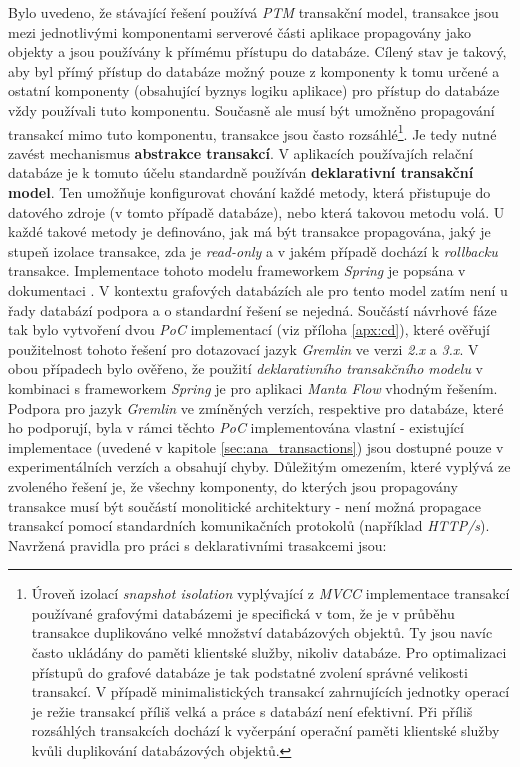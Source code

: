 Bylo uvedeno, že stávající řešení používá \textit{PTM} transakční model, transakce jsou mezi jednotlivými komponentami serverové části aplikace propagovány jako objekty a jsou používány k přímému přístupu do databáze. Cílený stav je takový, aby byl přímý přístup do databáze možný pouze z komponenty k tomu určené a ostatní komponenty (obsahující byznys logiku aplikace) pro přístup do databáze vždy používali tuto komponentu. Současně ale musí být umožněno propagování transakcí mimo tuto komponentu, transakce jsou často rozsáhlé\footnote{Úroveň izolací \textit{snapshot isolation} vyplývající z \textit{MVCC} implementace transakcí používané grafovými databázemi je specifická v tom, že je v průběhu transakce duplikováno velké množství databázových objektů. Ty jsou navíc často ukládány do paměti klientské služby, nikoliv databáze. Pro optimalizaci přístupů do grafové databáze je tak podstatné zvolení správné velikosti transakcí. V případě minimalistických transakcí zahrnujících jednotky operací je režie transakcí příliš velká a práce s databází není efektivní. Při příliš rozsáhlých transakcích dochází k vyčerpání operační paměti klientské služby kvůli duplikování databázových objektů.}. Je tedy nutné zavést mechanismus \textbf{abstrakce transakcí}.
V aplikacích používajích relační databáze je k tomuto účelu standardně používán \textbf{deklarativní transakční model}. Ten umožňuje konfigurovat chování každé metody, která přistupuje do datového zdroje (v tomto případě databáze), nebo která takovou metodu volá. U každé takové metody je definováno, jak má být transakce propagována, jaký je stupeň izolace transakce, zda je \textit{read-only} a v jakém případě dochází k \textit{rollbacku} transakce. Implementace tohoto modelu frameworkem \textit{Spring} je popsána v dokumentaci \cite{SpringTransactions}.
V kontextu grafových databázích ale pro tento model zatím není u řady databází podpora a o standardní řešení se nejedná. Součástí návrhové fáze tak bylo vytvoření dvou \textit{PoC} implementací (viz příloha \ref{apx:cd}), které ověřují použitelnost tohoto řešení pro dotazovací jazyk \textit{Gremlin} ve verzi \textit{2.x} a \textit{3.x}. V obou případech bylo ověřeno, že použití \textit{deklarativního transakčního modelu} v kombinaci s frameworkem \textit{Spring} je pro aplikaci \textit{Manta Flow} vhodným řešením. Podpora pro jazyk \textit{Gremlin} ve zmíněných verzích, respektive pro databáze, které ho podporují, byla v rámci těchto \textit{PoC} implementována vlastní - existující implementace (uvedené v kapitole \ref{sec:ana_transactions}) jsou dostupné pouze v experimentálních verzích a obsahují chyby.
Důležitým omezením, které vyplývá ze zvoleného řešení je, že všechny komponenty, do kterých jsou propagovány transakce musí být součástí monolitické architektury - není možná propagace transakcí pomocí standardních komunikačních protokolů (například \textit{HTTP/s}). Navržená pravidla pro práci s deklarativními trasakcemi jsou:

